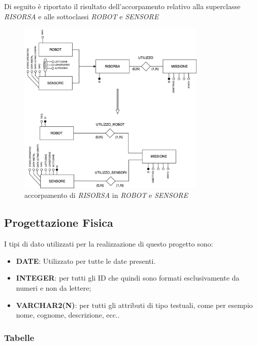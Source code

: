 Di seguito è riportato il risultato dell'accorpamento relativo alla superclasse \textit{RISORSA} e alle sottoclassi \textit{ROBOT} e \textit{SENSORE}

\begin{figure}[h!]
    \centering
    \includegraphics[width=0.8\textwidth]{Media/Generalizzazione_Specializzazione.png}
    \caption{accorpamento di \textit{RISORSA} in \textit{ROBOT} e \textit{SENSORE}}
    \label{fig:schema_portante}
\end{figure}

\subsection{Progettazione Fisica}

I tipi di dato utilizzati per la realizzazione di questo progetto sono:

\begin{itemize}
    \item \textbf{DATE}: Utilizzato per tutte le date presenti.
    \item \textbf{INTEGER}: per tutti gli ID che quindi sono formati esclusivamente da numeri e non da lettere;
    \item \textbf{VARCHAR2(N)}: per tutti gli attributi di tipo testuali, come per esempio nome, cognome, descrizione, ecc..
\end{itemize}

\subsubsection{Tabelle}

